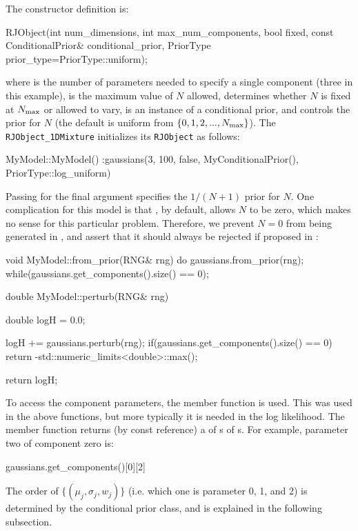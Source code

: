 \documentclass[article, nojss]{jss}
\begin{document}
The  constructor definition is:
\begin{CodeChunk}
\begin{CodeInput}
RJObject(int num_dimensions, int max_num_components, bool fixed,
         const ConditionalPrior& conditional_prior,
         PriorType prior_type=PriorType::uniform);
\end{CodeInput}
\end{CodeChunk}
where  is the number of parameters needed to
specify a single component (three in this example), 
is the maximum value of $N$ allowed,  determines whether
$N$ is fixed at $N_{\rm max}$ or allowed to vary,
 is an instance of a conditional prior,
and  controls the prior for $N$ (the default is uniform
from $\{0, 1, 2, ..., N_{\rm max}\}$). The {\tt RJObject\_1DMixture}
 initializes its {\tt RJObject} as follows:
\begin{CodeChunk}
\begin{CodeInput}
MyModel::MyModel()
:gaussians(3, 100, false, MyConditionalPrior(), PriorType::log_uniform)
{
}
\end{CodeInput}
\end{CodeChunk}
Passing  for the final argument
specifies the $1/(N+1)$ prior for $N$.
One complication for this model is that , by default,
allows $N$ to be zero, which makes no sense for this particular
problem. Therefore, we prevent $N=0$ from being generated in
, and assert that it should always be
rejected if proposed in :

\begin{CodeChunk}
\begin{CodeInput}
void MyModel::from_prior(RNG& rng)
{
    do
    {
        gaussians.from_prior(rng);
    }while(gaussians.get_components().size() == 0);
}

double MyModel::perturb(RNG& rng)
{
    double logH = 0.0;

    logH += gaussians.perturb(rng);
    if(gaussians.get_components().size() == 0)
        return -std::numeric_limits<double>::max();

    return logH;
}
\end{CodeInput}
\end{CodeChunk}

To access the component parameters, the  member function
 is used. This was used in the above functions, but more
typically it is needed in the log likelihood.
The member function  returns (by const reference) a
 of s of s. For example,
parameter two of component zero is:
\begin{CodeChunk}
\begin{CodeInput}
gaussians.get_components()[0][2]
\end{CodeInput}
\end{CodeChunk}
The order of $\{(\mu_j, \sigma_j, w_j)\}$
(i.e. which one is parameter 0, 1, and 2)
is determined by the conditional prior class, and is
explained in the following subsection.
\end{document}

